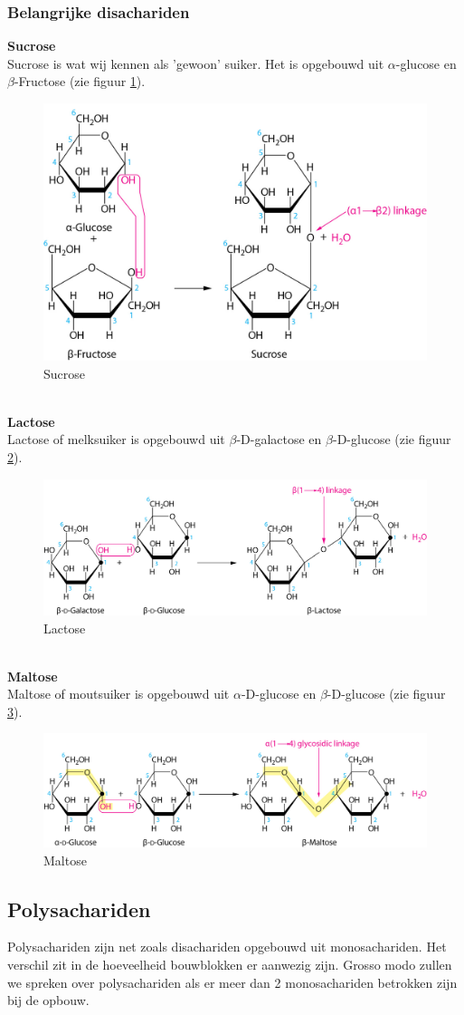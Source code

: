 \documentclass[a4paper,kul]{kulakarticle} %
\begin{document}
\subsubsection{Belangrijke disachariden}
\textbf{Sucrose}\\
Sucrose is wat wij kennen als 'gewoon' suiker. Het is opgebouwd uit $\alpha$-glucose en $\beta$-Fructose (zie figuur \ref{fig:sucrose}).
\begin{figure}[h]
	\centering
	\includegraphics[width=0.5\linewidth]{sucrose}
	\caption[Sucrose]{Sucrose}
	\label{fig:sucrose}
\end{figure}\\
\textbf{Lactose}\\
Lactose of melksuiker is opgebouwd uit $\beta$-D-galactose en $\beta$-D-glucose (zie figuur \ref{fig:lactose}).
\begin{figure}[h]
	\centering
	\includegraphics[width=0.6\linewidth]{Lactose}
	\caption[Lactose]{Lactose}
	\label{fig:lactose}
\end{figure}\\
\textbf{Maltose}\\
Maltose of moutsuiker is opgebouwd uit $\alpha$-D-glucose en $\beta$-D-glucose (zie figuur \ref{fig:maltose}).
\begin{figure}[h]
	\centering
	\includegraphics[width=0.6\linewidth]{Maltose}
	\caption[Maltose]{Maltose}
	\label{fig:maltose}
\end{figure}

\subsection{Polysachariden}
Polysachariden zijn net zoals disachariden opgebouwd uit monosachariden. Het verschil zit in de hoeveelheid bouwblokken er aanwezig zijn. Grosso modo zullen we spreken over polysachariden als er meer dan 2 monosachariden betrokken zijn bij de opbouw.
\end{document}
